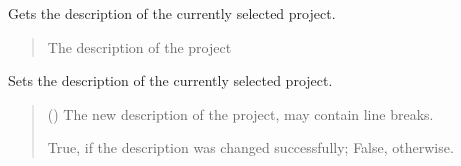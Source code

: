 \documentclass[letterpaper,10pt,english]{sphinxmanual}
\begin{document}
\begin{fulllineitems}
\begin{fulllineitems}
\end{fulllineitems}


\begin{fulllineitems}
\label{\detokenize{apidoc/src.osm_configurator.control:src.osm_configurator.control.control_interface.IControl.get_project_description}}
\pysigstartsignatures
{}
\pysigstopsignatures
\sphinxAtStartPar
Gets the description of the currently selected project.
\begin{quote}\begin{description}
\sphinxAtStartPar
The description of the project

\sphinxAtStartPar
{}

\end{description}\end{quote}

\end{fulllineitems}


\begin{fulllineitems}
\label{\detokenize{apidoc/src.osm_configurator.control:src.osm_configurator.control.control_interface.IControl.set_project_description}}
\pysigstartsignatures
{}
\pysigstopsignatures
\sphinxAtStartPar
Sets the description of the currently selected project.
\begin{quote}\begin{description}
\sphinxAtStartPar
{} () \textendash{} The new description of the project, may contain line breaks.

\sphinxAtStartPar
True, if the description was changed successfully; False, otherwise.


\end{description}
\end{quote}
\end{fulllineitems}
\end{fulllineitems}
\end{document}
